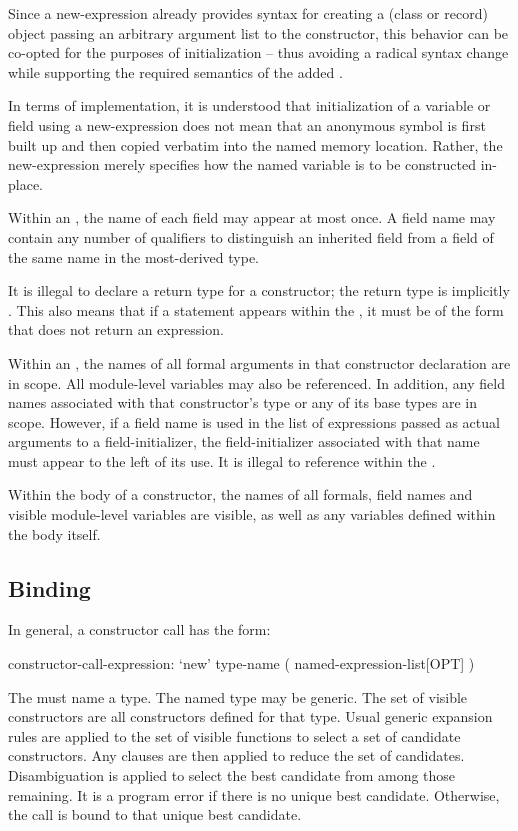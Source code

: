 \begin{rationale}
Since a new-expression already provides syntax for creating a (class or record) object
passing an arbitrary argument list to the constructor, this behavior can be co-opted for
the purposes of initialization -- thus avoiding a radical syntax change while supporting
the required semantics of the added .  

In terms of implementation, it is understood that initialization of a variable or field
using a new-expression does not mean that an anonymous symbol is first built up and then
copied verbatim into the named memory location.  Rather, the new-expression merely
specifies how the named variable is to be constructed in-place.
\end{rationale}

Within an , the name of each field may appear at most
once.  A field name may contain any number of  qualifiers to distinguish an
inherited field from a field of the same name in the most-derived type.

It is illegal to declare a return type for a constructor; the return type is
implicitly .  This also means that if a  statement
appears within the , it must be of the form that does not
return an expression.

Within an , the names of all formal arguments in that constructor
declaration are in scope.  All module-level variables may also be referenced.  In
addition, any field names associated with that constructor's type or any of its base types
are in scope.  However, if a field name is used in the list of expressions passed as
actual arguments to a field-initializer, the field-initializer associated with that name
must appear to the left of its use.  It is illegal to reference  within the
.

Within the body of a constructor, the names of all formals, field names and visible
module-level variables are visible, as well as any variables defined within the body
itself.


\subsection{Binding}

In general, a constructor call has the form:
\begin{syntax}
constructor-call-expression:
  `new' type-name ( named-expression-list[OPT] )
\end{syntax}
The  must name a type.  The named type may be generic.
The set of visible constructors are all constructors defined for that type.  Usual
generic expansion rules are applied to the set of visible functions to select a set of
candidate constructors.  Any  clauses are then applied to reduce the set of
candidates.  Disambiguation is applied to select the best candidate from among those
remaining.  It is a program error if there is no unique best candidate.  Otherwise, the
call is bound to that unique best candidate.

